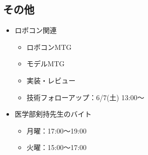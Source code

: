 \documentclass[uplatex, onecolumn, 10pt]{jsarticle}
\begin{document}
\subsection*{その他}
\begin{itemize}
    \item ロボコン関連
		\begin{itemize}
			\item ロボコンMTG
			\item モデルMTG
			\item 実装・レビュー
			\item 技術フォローアップ：6/7(土)	13:00～
		\end{itemize}
    \item 医学部剣持先生のバイト
    \begin{itemize}
			\item 月曜：17:00～19:00
			\item 火曜：15:00～17:00
		\end{itemize}
\end{itemize}
\end{document}
